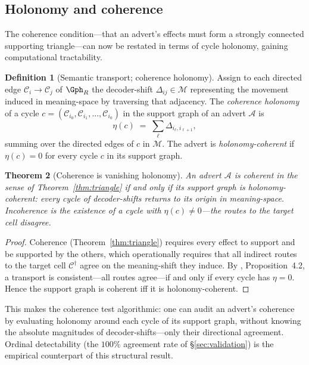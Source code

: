 \documentclass[twocolumn,11pt,a4paper]{article}
\theoremstyle{adv}
\newtheorem{theorem}{Theorem}[section]
\theoremstyle{definition}
\newtheorem{definition}[theorem]{Definition}
\theoremstyle{remark}
\newcommand{\Cell}{\mathcal{C}}        %
\newcommand{\Recv}{R}                  %
\newcommand{\Mean}{\mathcal{M}}        %
\newcommand{\shift}{\Delta}            %
\newcommand{\Adv}{\mathcal{A}}        %
\begin{document}
\subsection{Holonomy and coherence}

The coherence condition---that an advert's effects must form a strongly connected
supporting triangle---can now be restated in terms of cycle holonomy, gaining
computational tractability.

\begin{definition}[Semantic transport; coherence holonomy]
\label{def:holonomy-ad}
Assign to each directed edge $\Cell_i\to\Cell_j$ of $\Gph_\Recv$ the
decoder-shift $\shift_{ij}\in\Mean$ representing the movement induced in
meaning-space by traversing that adjacency. The \emph{coherence holonomy} of a
cycle $c=(\Cell_{i_0},\Cell_{i_1},\dots,\Cell_{i_0})$ in the support graph of
an advert $\Adv$ is
\[
  \eta(c) \;=\; \sum_{\ell} \shift_{i_\ell,i_{\ell+1}},
\]
summing over the directed edges of $c$ in $\Mean$. The advert is
\emph{holonomy-coherent} if $\eta(c)=0$ for every cycle $c$ in its support
graph.
\end{definition}

\begin{theorem}[Coherence is vanishing holonomy]
\label{thm:coherence-holonomy}
An advert $\Adv$ is coherent in the sense of Theorem~\ref{thm:triangle} if and
only if its support graph is holonomy-coherent: every cycle of decoder-shifts
returns to its origin in meaning-space. Incoherence is the existence of a
cycle with $\eta(c)\neq0$---the routes to the target cell disagree.
\end{theorem}

\begin{proof}
Coherence (Theorem~\ref{thm:triangle}) requires every effect to support and
be supported by the others, which operationally requires that all indirect
routes to the target cell $\Cell^\dagger$ agree on the meaning-shift they
induce. By \citet{sachikonye2025knowledge}, Proposition~4.2, a transport is
consistent---all routes agree---if and only if every cycle has $\eta=0$.
Hence the support graph is coherent iff it is holonomy-coherent.
\end{proof}

This makes the coherence test algorithmic: one can audit an advert's coherence
by evaluating holonomy around each cycle of its support graph, without knowing
the absolute magnitudes of decoder-shifts---only their directional agreement.
Ordinal detectability (the $100\%$ agreement rate of \S\ref{sec:validation})
is the empirical counterpart of this structural result.
\end{document}
